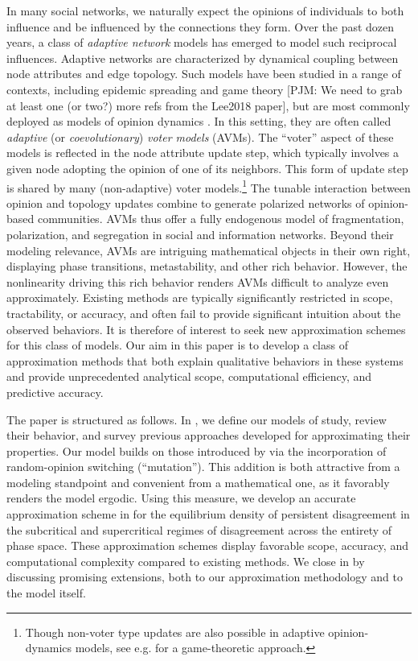 \documentclass[review, onefignum, onetabnum]{siamart171218}
\newcommand{\pjm}[1]{{\color{blue}[PJM: #1]}}
\begin{document}
    In many social networks, we naturally expect the opinions of individuals to both influence and be influenced by the connections they form. 
	Over the past dozen years, a class of \emph{adaptive network} models has emerged to model such reciprocal influences. 
	Adaptive networks \cite{Gross2008,Gross2009} are characterized by dynamical coupling between node attributes and edge topology.
	Such models have been studied in a range of contexts, including epidemic spreading \cite{Gross2006,Marceau2010,Gross2017,Lee2017,Horstmeyer2018} and game theory \cite{Lee2018} \pjm{We need to grab at least one (or two?) more refs from the Lee2018 paper}, but are most commonly deployed as models of opinion dynamics \cite{Holme2006,Durrett2012,Gross2012,Gross2014,Malik2016,Shi2013}. 
	In this setting, they are often called \emph{adaptive} (or \emph{coevolutionary}) \emph{voter models} (AVMs). 
	The ``voter'' aspect of these models is reflected in the node attribute update step, which typically involves a given node adopting the opinion of one of its neighbors. 
	This form of update step is shared by many (non-adaptive) voter models.\footnote{Though non-voter type updates are also possible in adaptive opinion-dynamics models, see e.g. \cite{Bhawalkar2013a} for a game-theoretic approach.} 
	The tunable interaction between opinion and topology updates combine to generate polarized networks of opinion-based communities. 
	AVMs thus offer a fully endogenous model of fragmentation, polarization, and segregation in social and information networks. 
	Beyond their modeling relevance, AVMs are intriguing mathematical objects in their own right, displaying phase transitions, metastability, and other rich behavior. 
	However, the nonlinearity driving this rich behavior renders AVMs difficult to analyze even approximately. 
	Existing methods are typically significantly restricted in scope, tractability, or accuracy, and often fail to provide significant intuition about the observed behaviors. 
	It is therefore of interest to seek new approximation schemes for this class of models. 
	Our aim in this paper is to develop a class of approximation methods that both explain qualitative behaviors in these systems and provide unprecedented analytical scope, computational efficiency, and predictive accuracy. 

	The paper is structured as follows. 
	In , we define our models of study, review their behavior, and survey previous approaches developed for approximating their properties. 
	Our model builds on those introduced by \cite{Holme2006, Durrett2012} via the incorporation of random-opinion switching (``mutation''). 
	This addition is both attractive from a modeling standpoint and convenient from a mathematical one, as it favorably renders the model ergodic. 
	Using this measure, we develop an accurate approximation scheme in  for the equilibrium density of persistent disagreement in the subcritical and supercritical regimes of disagreement across the entirety of phase space.
	These approximation schemes display favorable scope, accuracy, and computational complexity compared to existing methods.
	We close in  by discussing promising extensions, both to our approximation methodology and to the model itself. 
	
\end{document}
